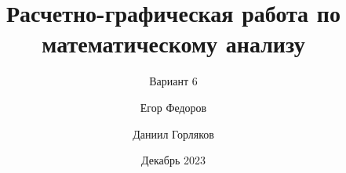 \documentclass[aspectratio=169]{beamer}
\title[РГР по матанализу]
{Расчетно-графическая работа по математическому анализу}
\subtitle{Вариант 6}
\author[Федоров, Горляков]
{Егор Федоров \and Даниил Горляков}
\institute[ИТМО]{Университет ИТМО}
\date[2023 г.]{Декабрь 2023}
\begin{document}
\frame{\titlepage}




\end{document}
